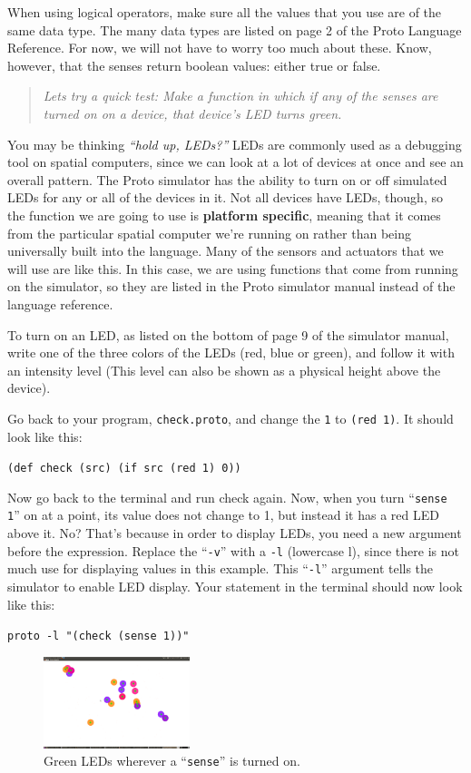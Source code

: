 \documentclass{article}
\newcommand\code[1]{\begin{center}\var{#1}\end{center}}
\newcommand\problem[1]{\begin{quote}{\em #1}\end{quote}}
\newcommand\var[1]{{\tt #1}}
\newcommand\qvar[1]{``{\tt #1}''}
\begin{document}
When using logical operators, make sure all the values that you use
are of the same data type.  The many data types are listed on page 2
of the Proto Language Reference.  For now, we will not have to worry
too much about these.  Know, however, that the senses return boolean
values: either true or false.

\problem{Lets try a quick test: Make a function in which if any of the senses
are turned on on a device, that device's LED turns green.}

You may be thinking {\em ``hold up, LEDs?''}  LEDs are commonly used
as a debugging tool on spatial computers, since we can look at a lot
of devices at once and see an overall pattern.  The Proto simulator
has the ability to turn on or off simulated LEDs for any or all of the
devices in it.  Not all devices have LEDs, though, so the function we
are going to use is {\bf platform specific}, meaning that it comes
from the particular spatial computer we're running on rather than
being universally built into the language.  Many of the sensors and
actuators that we will use are like this.  In this case, we are using
functions that come from running on the simulator, so they are listed
in the Proto simulator manual instead of the language reference.

To turn on an LED, as listed on the bottom of page 9 of the simulator
manual, write one of the three colors of the LEDs (red, blue or
green), and follow it with an intensity level (This level can also be
shown as a physical height above the device).

Go back to your program, \var{check.proto}, and change the \var{1} to
\var{(red 1)}.  It should look like this: \code{(def check (src) (if
  src (red 1) 0))}  Now go back to the terminal and run check again.
Now, when you turn \qvar{sense 1} on at a point, its value does not
change to 1, but instead it has a red LED above it.  No?  That's
because in order to display LEDs, you need a new argument before the
expression.  Replace the \qvar{-v} with a \var{-l} (lowercase l),
since there is not much use for displaying values in this example.
This \qvar{-l} argument tells the simulator to enable LED
display. Your statement in the terminal should now look like this:

\code{proto -l "(check (sense 1))"}

\begin{figure}
  \includegraphics[width=0.38\textwidth]{figures/sense-led.png}
  \caption{Green LEDs wherever a \qvar{sense} is turned on.}
  \label{f:leds}
\end{figure}
\end{document}
